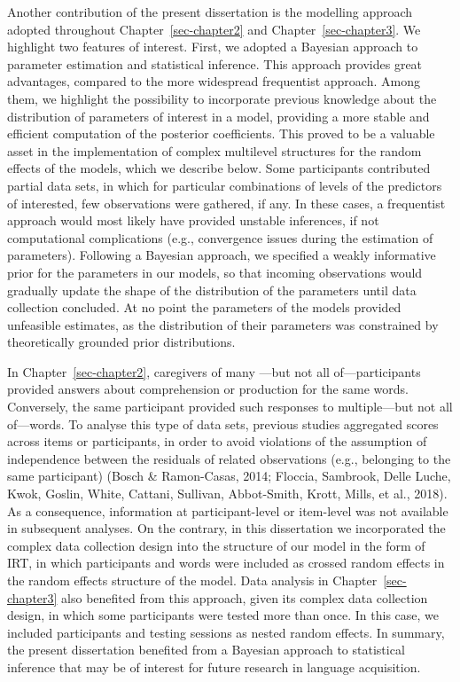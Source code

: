 \documentclass[
  12pt,
  b5paperpaper,
  twoside]{scrreprt}
\begin{document}
Another contribution of the present dissertation is the modelling
approach adopted throughout Chapter~\ref{sec-chapter2} and
Chapter~\ref{sec-chapter3}. We highlight two features of interest.
First, we adopted a Bayesian approach to parameter estimation and
statistical inference. This approach provides great advantages, compared
to the more widespread frequentist approach. Among them, we highlight
the possibility to incorporate previous knowledge about the distribution
of parameters of interest in a model, providing a more stable and
efficient computation of the posterior coefficients. This proved to be a
valuable asset in the implementation of complex multilevel structures
for the random effects of the models, which we describe below. Some
participants contributed partial data sets, in which for particular
combinations of levels of the predictors of interested, few observations
were gathered, if any. In these cases, a frequentist approach would most
likely have provided unstable inferences, if not computational
complications (e.g., convergence issues during the estimation of
parameters). Following a Bayesian approach, we specified a weakly
informative prior for the parameters in our models, so that incoming
observations would gradually update the shape of the distribution of the
parameters until data collection concluded. At no point the parameters
of the models provided unfeasible estimates, as the distribution of
their parameters was constrained by theoretically grounded prior
distributions.

In Chapter~\ref{sec-chapter2}, caregivers of many ---but not all
of---participants provided answers about comprehension or production for
the same words. Conversely, the same participant provided such responses
to multiple---but not all of---words. To analyse this type of data sets,
previous studies aggregated scores across items or participants, in
order to avoid violations of the assumption of independence between the
residuals of related observations (e.g., belonging to the same
participant) (Bosch \& Ramon-Casas, 2014; Floccia, Sambrook, Delle
Luche, Kwok, Goslin, White, Cattani, Sullivan, Abbot-Smith, Krott,
Mills, et al., 2018). As a consequence, information at participant-level
or item-level was not available in subsequent analyses. On the contrary,
in this dissertation we incorporated the complex data collection design
into the structure of our model in the form of IRT, in which
participants and words were included as crossed random effects in the
random effects structure of the model. Data analysis in
Chapter~\ref{sec-chapter3} also benefited from this approach, given its
complex data collection design, in which some participants were tested
more than once. In this case, we included participants and testing
sessions as nested random effects. In summary, the present dissertation
benefited from a Bayesian approach to statistical inference that may be
of interest for future research in language acquisition.
\end{document}
